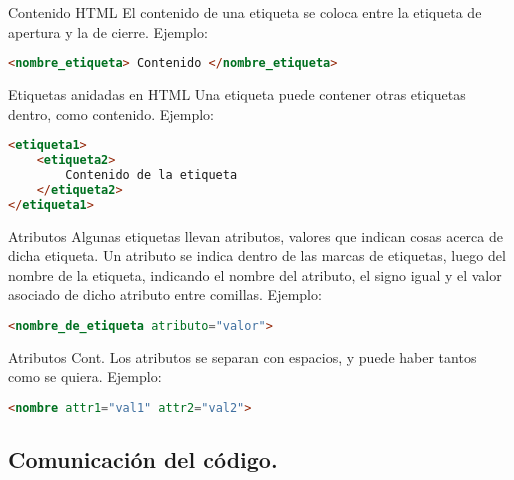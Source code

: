 
\begin{frame}[fragile]{Contenido HTML}
  El contenido de una etiqueta se coloca entre la etiqueta de apertura y la de
  cierre.
	\jump
	Ejemplo:
	\begin{lstlisting}[language=HTML]
<nombre_etiqueta> Contenido </nombre_etiqueta>
	\end{lstlisting}
\end{frame}


\begin{frame}[fragile]{Etiquetas anidadas en HTML}
	Una etiqueta puede contener otras etiquetas dentro, como contenido.
	\jump
	Ejemplo:
	\begin{lstlisting}[language=HTML]
<etiqueta1>
	<etiqueta2>
		Contenido de la etiqueta
	</etiqueta2>
</etiqueta1>
	\end{lstlisting}
\end{frame}


\begin{frame}[fragile]{Atributos}
	Algunas etiquetas llevan atributos, valores que indican cosas acerca de dicha
	etiqueta.
	\jump
	Un atributo se indica dentro de las marcas de etiquetas, luego del nombre de
	la etiqueta, indicando el nombre del atributo, el signo igual y el valor
	asociado de dicho atributo entre comillas.
	\jump
	Ejemplo:
	\begin{lstlisting}[language=HTML]
<nombre_de_etiqueta atributo="valor">
	\end{lstlisting}
\end{frame}


\begin{frame}[fragile]{Atributos Cont.}
	Los atributos se separan con espacios, y puede haber tantos como se quiera.
	\jump
  Ejemplo:
	\begin{lstlisting}[language=HTML]
<nombre attr1="val1" attr2="val2">
	\end{lstlisting}
\end{frame}


\subsection{Comunicación del código.}

